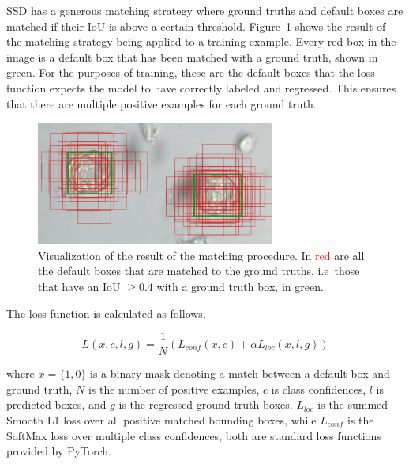 SSD has a generous matching strategy where ground truths and default boxes are matched if their IoU is above a certain threshold.
Figure~\ref{fig:priors} shows the result of the matching strategy being applied to a training example.
Every red box in the image is a default box that has been matched with a ground truth, shown in green.
For the purposes of training, these are the default boxes that the loss function expects the model to have correctly labeled and regressed.
This ensures that there are multiple positive examples for each ground truth.

\begin{figure}[htbp]
  \centering
  \includegraphics[width=0.7\textwidth]{figs/method/priors_matching.png}
  \caption[Default box matching]{Visualization of the result of the matching procedure.
In \textcolor{red}{red} are all the default boxes that are matched to the ground truths, i.e\ those that have an IoU \( \geq 0.4 \) with a ground truth box, in \textcolor{nicegreen}{green}.}\label{fig:priors}
\end{figure}
The loss function is calculated as follows,

\begin{equation}\label{eq:loss}
  L(x,c,l,g)=\frac{1}{N}\left( L_{conf}(x,c) + \alpha L_{loc}(x,l,g)\right)
\end{equation}

where \( x=\{1,0\} \) is a binary mask denoting a match between a default box and ground truth, \( N \) is the number of positive examples, \( c \) is class confidences, \( l \) is predicted boxes, and \( g \) is the regressed ground truth boxes.
\( L_{loc} \) is the summed Smooth L1 loss over all positive matched bounding boxes, while \( L_{conf} \) is the SoftMax loss over multiple class confidences, both are standard loss functions provided by PyTorch.

